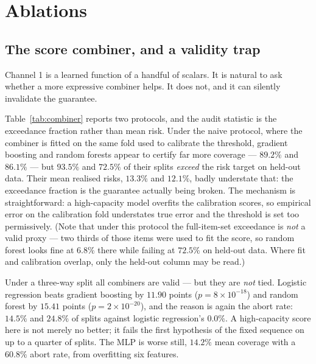 \documentclass{article}
\theoremstyle{plain}
\theoremstyle{definition}
\theoremstyle{remark}
\begin{document}
\section{Ablations}
\label{sec:ablations}

\subsection{The score combiner, and a validity trap}

Channel 1 is a learned function of a handful of scalars. It is natural to ask whether a
more expressive combiner helps. It does not, and it can silently invalidate the guarantee.

Table~\ref{tab:combiner} reports two protocols, and the audit statistic is the exceedance
fraction rather than mean risk. Under the naive protocol, where the combiner is fitted on the
same fold used to calibrate the threshold, gradient boosting and random forests appear to
certify far more coverage --- $89.2\%$ and $86.1\%$ --- but $93.5\%$ and $72.5\%$ of their splits
\emph{exceed} the risk target on held-out data. Their mean realised risks, $13.3\%$ and $12.1\%$,
badly understate that: the exceedance fraction is the guarantee actually being
broken. The mechanism is straightforward: a high-capacity model overfits
the calibration scores, so empirical error on the calibration fold understates true error and the
threshold is set too permissively. (Note that under this protocol the full-item-set exceedance is
\emph{not} a valid proxy --- two thirds of those items were used to fit the score, so random
forest looks fine at $6.8\%$ there while failing at $72.5\%$ on held-out data. Where fit and
calibration overlap, only the held-out column may be read.)

Under a three-way split all combiners are valid --- but they are \emph{not} tied. Logistic
regression beats gradient boosting by $11.90$
points ($p=8\times10^{-18}$) and random forest by $15.41$ points ($p=2\times10^{-20}$), and the
reason is again the abort rate: $14.5\%$ and $24.8\%$ of splits against logistic regression's
$0.0\%$. A high-capacity score here is not merely no better; it fails the first hypothesis of the
fixed sequence on up to a quarter of splits. The MLP is worse still, $14.2\%$ mean coverage with
a $60.8\%$ abort rate, from overfitting six features.
\end{document}

